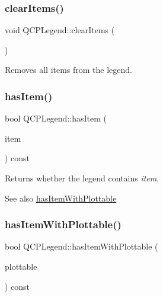 \subsubsection{\texorpdfstring{clear\+Items()}{clearItems()}}
{\footnotesize\ttfamily void Q\+C\+P\+Legend\+::clear\+Items (\begin{DoxyParamCaption}{ }\end{DoxyParamCaption})}

Removes all items from the legend. \mbox{\label{class_q_c_p_legend_ad0f698e33db454a6c103b5206740e599}} 
\subsubsection{\texorpdfstring{has\+Item()}{hasItem()}}
{\footnotesize\ttfamily bool Q\+C\+P\+Legend\+::has\+Item (\begin{DoxyParamCaption}\item[{\hyperlink{class_q_c_p_abstract_legend_item}{Q\+C\+P\+Abstract\+Legend\+Item} $\ast$}]{item }\end{DoxyParamCaption}) const}

Returns whether the legend contains {\itshape item}.

\begin{DoxySeeAlso}{See also}
\hyperlink{class_q_c_p_legend_a4b90a442af871582df85c2bc13f91e88}{has\+Item\+With\+Plottable} 
\end{DoxySeeAlso}
\mbox{\label{class_q_c_p_legend_a4b90a442af871582df85c2bc13f91e88}} 
\subsubsection{\texorpdfstring{has\+Item\+With\+Plottable()}{hasItemWithPlottable()}}
{\footnotesize\ttfamily bool Q\+C\+P\+Legend\+::has\+Item\+With\+Plottable (\begin{DoxyParamCaption}\item[{const \hyperlink{class_q_c_p_abstract_plottable}{Q\+C\+P\+Abstract\+Plottable} $\ast$}]{plottable }\end{DoxyParamCaption}) const}

